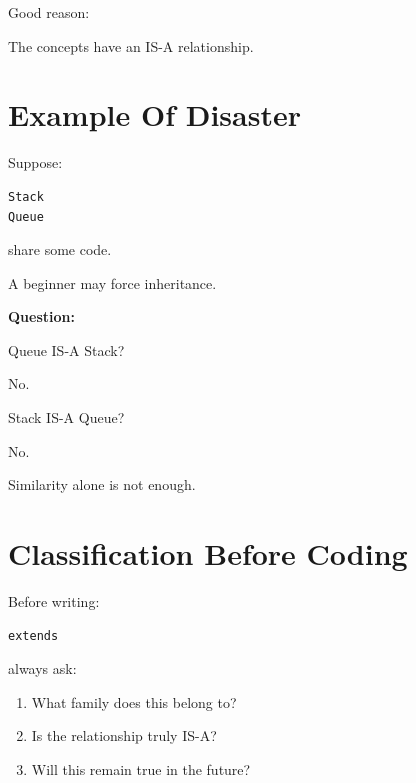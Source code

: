 \documentclass[11pt,a4paper]{book}
\begin{document}

Good reason:

\begin{center}
The concepts have an IS-A relationship.
\end{center}


\section{Example Of Disaster}

Suppose:

\begin{verbatim}
Stack
Queue
\end{verbatim}

share some code.


A beginner may force inheritance.


\textbf{Question:}

Queue IS-A Stack?

No.

Stack IS-A Queue?

No.


Similarity alone is not enough.


\section{Classification Before Coding}

Before writing:

\begin{verbatim}
extends
\end{verbatim}

always ask:

\begin{enumerate}

\item What family does this belong to?

\item Is the relationship truly IS-A?\@

\item Will this remain true in the future?

\end{enumerate}
\end{document}
